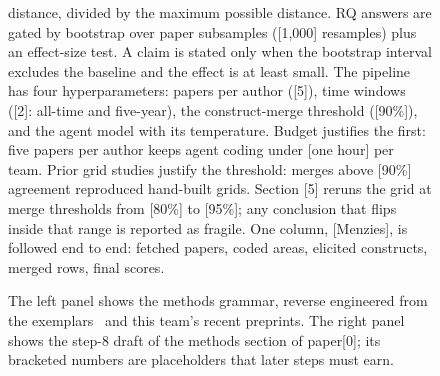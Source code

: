 \begin{figure}[t!]
{\begin{minipage}[t]{\dimexpr0.50\textwidth-2\fboxsep-2\fboxrule}
distance, divided by the maximum possible distance.
RQ answers are gated by bootstrap over paper subsamples
([1,000] resamples) plus an effect-size test.
A claim is stated only when the bootstrap interval excludes the
baseline and the effect is at least small.
The pipeline has four hyperparameters: papers per author ([5]),
time windows ([2]: all-time and five-year), the construct-merge
threshold ([90\%]), and the agent model with its temperature.
Budget justifies the first: five papers per author keeps agent
coding under [one hour] per team.
Prior grid studies justify the threshold: merges above [90\%]
agreement reproduced hand-built grids.
Section [5] reruns the grid at merge thresholds from [80\%] to
[95\%]; any conclusion that flips inside that range is reported
as fragile.
One column, [Menzies], is followed end to end: fetched papers,
coded areas, elicited constructs, merged rows, final scores.
\end{minipage}}
\vspace{1mm}
\caption{The left panel shows the methods grammar, reverse
engineered from the exemplars~\cite{kocaguneli12,fu17,ladisa23}
and this team's recent preprints.
The right panel shows the step-8 draft of the methods section of
{\ttfamily paper[0]}; its bracketed numbers are placeholders that
later steps must earn.}
\label{fig:methodsbnf}
\label{fig:samplemethods}
\end{figure}

